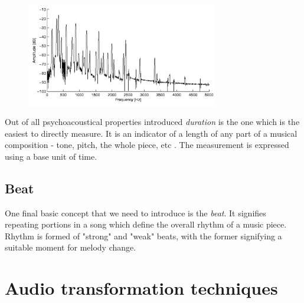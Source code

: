 \begin{figure}[H]
    \centering
    \includegraphics[width=0.75\textwidth]{BackgroundTheory/spectral_envelope}
    \label{fig:spectral-envelope}
\end{figure}

Out of all psychoacoustical properties introduced \textit{duration} is the one
which is the easiest to directly measure. It is an indicator of a length of any
part of a musical composition - tone, pitch, the whole piece, etc
\cite{benward2014music}. The measurement is expressed using a base unit of time.

\subsection{Beat}
\label{subsec:beat}
One final basic concept that we need to introduce is the \textit{beat}. It
signifies repeating portions in a song which define the overall rhythm of a
music piece. Rhythm is formed of "strong" and "weak" beats, with the former
signifying a suitable moment for melody change.




\section{Audio transformation techniques}
\label{sec:audiotransform}


